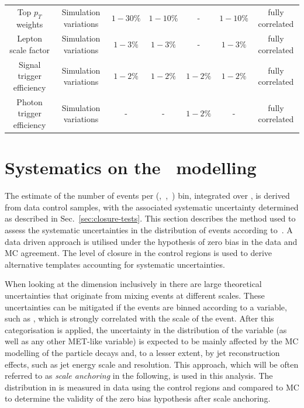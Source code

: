 \begin{landscape}
\begin{table}[h!]
\begin{tabular}{ ccccccc }
    Top $p_{T}$ weights & Simulation variations & $1-30\%$  & $1-10\%$ & - & $1-10\%$ & fully correlated \\
    Lepton scale factor & Simulation variations & $1-3\%$ & $1-3\%$ & - & $1-3\%$ & fully correlated \\
    Signal trigger efficiency & Simulation variations & $1-2\%$ & $1-2\%$ & $1-2\%$ & $1-2\%$ & fully correlated \\
    Photon trigger efficiency & Simulation variations & - & - & $1-2\%$ & - & fully correlated \\
    \hline
    \hline
  \end{tabular}
\end{table}
\end{landscape}


\section{Systematics on the \mht~modelling}
\label{sec:syst-on-shape}

The estimate of the number of events per (\njet,~\nb,~\scalht) bin,
integrated over \mht, is derived from data control samples, with
the associated systematic uncertainty determined as 
described in Sec.~\ref{sec:closure-tests}. This section
describes the method used to assess the systematic uncertainties in
the distribution of events according to~\mht. A data driven approach is
utilised under the hypothesis of zero bias in the data and MC agreement.
The level of closure in the control regions is used
to derive alternative templates accounting for systematic uncertainties.

When looking at the \mht dimension inclusively in \scalht there are
large theoretical uncertainties that originate from mixing events
at different scales. These uncertainties can be mitigated if the events 
are binned according to a variable, such as \scalht, 
which is strongly correlated with the scale of the event. 
After this categorisation is applied, the uncertainty in 
the distribution of the \mht variable
(as well as any other MET-like variable) is expected to be 
mainly affected by the MC modelling of the particle 
decays and, to a lesser extent, by jet reconstruction effects, 
such as jet energy scale and resolution. 
This approach, which will be often referred to as \textit{scale anchoring}
in the following, is used in this analysis. The distribution in \mht
is measured in data using the control regions and compared to MC
to determine the validity of the zero bias hypothesis after scale anchoring.

